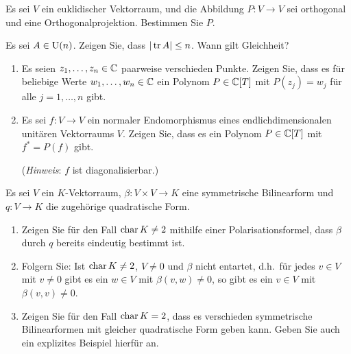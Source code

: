 \documentclass[a4paper,10pt]{scrartcl}
\begin{document}
\begin{question}
  Es sei $V$ ein euklidischer Vektorraum, und die Abbildung $P \colon V \to V$ sei orthogonal und eine Orthogonalprojektion.
  Bestimmen Sie $P$.
\end{question}


\begin{question}
  Es sei $A \in \operatorname{U}(n)$.
  Zeigen Sie, dass $|\operatorname{tr} A| \leq n$.
  Wann gilt Gleichheit?
\end{question}


\begin{question}
  \begin{enumerate}[leftmargin=*]
    \item
      Es seien $z_1, \dotsc, z_n \in \mathbb{C}$ paarweise verschieden Punkte.
      Zeigen Sie, dass es für beliebige Werte $w_1, \dotsc, w_n \in \mathbb{C}$ ein Polynom $P \in \mathbb{C}[T]$ mit $P(z_j) = w_j$ für alle $j = 1, \dotsc, n$ gibt.
    \item
      Es sei $f \colon V \to V$ ein normaler Endomorphismus eines endlichdimensionalen unitären Vektorraums $V$.
      Zeigen Sie, dass es ein Polynom $P \in \mathbb{C}[T]$ mit $f^* = P(f)$ gibt.
      
      (\emph{Hinweis}:
       $f$ ist diagonalisierbar.)
  \end{enumerate}
\end{question}














\begin{question}
  Es sei $V$ ein $K$-Vektorraum, $\beta \colon V \times V \to K$ eine symmetrische Bilinearform und $q \colon V \to K$ die zugehörige quadratische Form.
  \begin{enumerate}[leftmargin=*]
    \item
      Zeigen Sie für den Fall $\operatorname{char} K \neq 2$ mithilfe einer Polarisationsformel, dass $\beta$ durch $q$ bereits eindeutig bestimmt ist.
    \item
      Folgern Sie:
      Ist $\operatorname{char} K \neq 2$, $V \neq 0$ und $\beta$ nicht entartet, d.h.\ für jedes $v \in V$ mit $v \neq 0$ gibt es ein $w \in V$ mit $\beta(v, w) \neq 0$, so gibt es ein $v \in V$ mit $\beta(v,v) \neq 0$.
    \item
      Zeigen Sie für den Fall $\operatorname{char} K = 2$, dass es verschieden symmetrische Bilinearformen mit gleicher quadratische Form geben kann.
      Geben Sie auch ein explizites Beispiel hierfür an.
  \end{enumerate}
\end{question}
\end{document}
